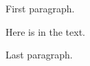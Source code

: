 \documentclass{article}
\begin{document}
First paragraph.

Here is \undefinedmacro{} in the text.

Last paragraph.
\end{document}
